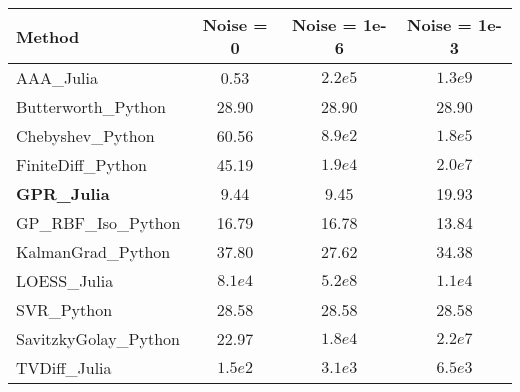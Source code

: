 \begin{tabular}{@{}l|ccc@{}}
\toprule
\textbf{Method} & \textbf{Noise = 0} & \textbf{Noise = 1e-6} & \textbf{Noise = 1e-3} \\
\midrule
AAA\_Julia & {\color{successgreen}0.53} & {\color{errorred}$2.2e5$} & {\color{errorred}$1.3e9$} \\
Butterworth\_Python & 28.90 & 28.90 & 28.90 \\
Chebyshev\_Python & 60.56 & $8.9e2$ & {\color{errorred}$1.8e5$} \\
FiniteDiff\_Python & 45.19 & {\color{errorred}$1.9e4$} & {\color{errorred}$2.0e7$} \\
\textbf{GPR\_Julia} & {\color{successgreen}9.44} & {\color{successgreen}9.45} & 19.93 \\
GP\_RBF\_Iso\_Python & 16.79 & 16.78 & 13.84 \\
KalmanGrad\_Python & 37.80 & 27.62 & 34.38 \\
LOESS\_Julia & {\color{errorred}$8.1e4$} & {\color{errorred}$5.2e8$} & {\color{errorred}$1.1e4$} \\
SVR\_Python & 28.58 & 28.58 & 28.58 \\
SavitzkyGolay\_Python & 22.97 & {\color{errorred}$1.8e4$} & {\color{errorred}$2.2e7$} \\
TVDiff\_Julia & $1.5e2$ & {\color{errorred}$3.1e3$} & {\color{errorred}$6.5e3$} \\
\bottomrule
\end{tabular}
